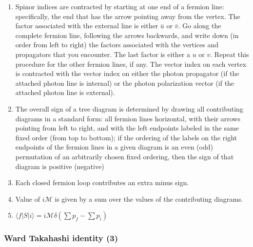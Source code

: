 \begin{enumerate}
\item Spinor indices are contracted by starting at one end of a fermion line: specifically, the end that has the arrow pointing away from the vertex. The factor associated with the external line is either $\bar{u}$ or $\bar{v}$. Go along the complete fermion line, following the arrows backwards, and write down (in order from left to right) the factors associated with the vertices and propagators that you encounter. The last factor is either a $u$ or $v$. Repeat this procedure for the other fermion lines, if any. The vector index on each vertex is contracted with the vector index on either the photon propagator (if the attached photon line is internal) or the
photon polarization vector (if the attached photon line is external).
\item The overall sign of a tree diagram is determined by drawing all contributing diagrams in a standard form: all fermion lines horizontal, with their arrows pointing from left to right, and with the left endpoints labeled in the same fixed order (from top to bottom); if the ordering of the labels on the right endpoints of the fermion lines in a given diagram is an even (odd) permutation of an arbitrarily chosen fixed ordering, then the sign of that diagram is positive (negative)
\item Each closed fermion loop contributes an extra minus sign.
\item Value of $i\mathcal{M}$ is given by a sum over the values of the contributing diagrams.
\item $\langle f | S | i \rangle = i\mathcal{M}\delta(\sum p_f -\sum p_i)$
\end{enumerate}
\subsubsection{Ward Takahashi identity (3)}

